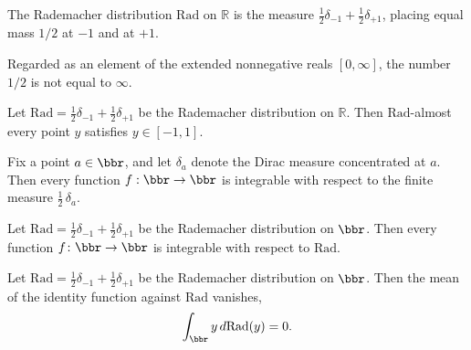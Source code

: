 \begin{definition}
\label{rademacherReal}
\leanok
The Rademacher distribution $\mathrm{Rad}$ on $\mathbb{R}$ is the measure
$\tfrac{1}{2}\delta_{-1} + \tfrac{1}{2}\delta_{+1}$, placing equal mass $1/2$
at $-1$ and at $+1$.
\end{definition}

\begin{lemma}
\label{rad_half_ne_top}
\leanok
{}
Regarded as an element of the extended nonnegative reals $[0,\infty]$, the number $1/2$
is not equal to $\infty$.
\end{lemma}

\begin{lemma}
\label{rademacherReal_mem_Icc}
\leanok
{}
Let $\mathrm{Rad} = \tfrac{1}{2}\delta_{-1} + \tfrac{1}{2}\delta_{+1}$ be the Rademacher
distribution on $\mathbb{R}$. Then $\mathrm{Rad}$-almost every point $y$ satisfies $y
\in [-1, 1]$.
\end{lemma}

\begin{lemma}
\label{integrable_smul_dirac}
\leanok
{}
Fix a point $a \in \bbr$, and let $\delta_a$ denote the Dirac measure concentrated at
$a$. Then every function $f : \bbr \to \bbr$ is integrable with respect to the finite
measure $\tfrac{1}{2}\,\delta_a$.
\end{lemma}

\begin{lemma}
\label{integrable_rademacherReal}
\leanok
{}
Let $\mathrm{Rad} = \tfrac{1}{2}\delta_{-1} + \tfrac{1}{2}\delta_{+1}$ be the Rademacher
distribution on $\bbr$. Then every function $f \colon \bbr \to \bbr$ is integrable with
respect to $\mathrm{Rad}$.
\end{lemma}

\begin{lemma}
\label{integral_id_rademacherReal}
\leanok
{}
Let $\mathrm{Rad} = \tfrac{1}{2}\delta_{-1} + \tfrac{1}{2}\delta_{+1}$ be the Rademacher
distribution on $\bbr$. Then the mean of the identity function against $\mathrm{Rad}$
vanishes, \[ \int_{\bbr} y \, d\mathrm{Rad}(y) = 0. \]
\end{lemma}

